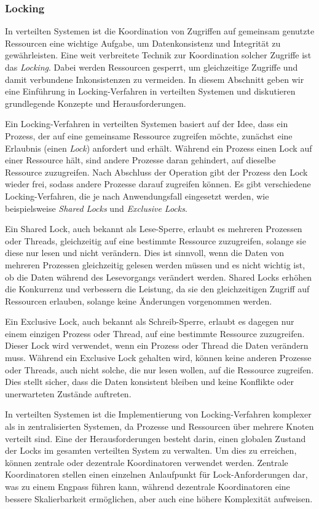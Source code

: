 \subsubsection{Locking}
In verteilten Systemen ist die Koordination von Zugriffen auf gemeinsam genutzte Ressourcen eine wichtige Aufgabe, um Datenkonsistenz und Integrität zu gewährleisten. Eine weit verbreitete Technik zur Koordination solcher Zugriffe ist das \textit{Locking}. Dabei werden Ressourcen gesperrt, um gleichzeitige Zugriffe und damit verbundene Inkonsistenzen zu vermeiden. In diesem Abschnitt geben wir eine Einführung in Locking-Verfahren in verteilten Systemen und diskutieren grundlegende Konzepte und Herausforderungen.

Ein Locking-Verfahren in verteilten Systemen basiert auf der Idee, dass ein Prozess, der auf eine gemeinsame Ressource zugreifen möchte, zunächst eine Erlaubnis (einen \textit{Lock}) anfordert und erhält. Während ein Prozess einen Lock auf einer Ressource hält, sind andere Prozesse daran gehindert, auf dieselbe Ressource zuzugreifen. Nach Abschluss der Operation gibt der Prozess den Lock wieder frei, sodass andere Prozesse darauf zugreifen können. Es gibt verschiedene Locking-Verfahren, die je nach Anwendungsfall eingesetzt werden, wie beispielsweise \textit{Shared Locks} und \textit{Exclusive Locks}.

Ein Shared Lock, auch bekannt als Lese-Sperre, erlaubt es mehreren Prozessen oder Threads, gleichzeitig auf eine bestimmte Ressource zuzugreifen, solange sie diese nur lesen und nicht verändern. Dies ist sinnvoll, wenn die Daten von mehreren Prozessen gleichzeitig gelesen werden müssen und es nicht wichtig ist, ob die Daten während des Lesevorgangs verändert werden. Shared Locks erhöhen die Konkurrenz und verbessern die Leistung, da sie den gleichzeitigen Zugriff auf Ressourcen erlauben, solange keine Änderungen vorgenommen werden.

Ein Exclusive Lock, auch bekannt als Schreib-Sperre, erlaubt es dagegen nur einem einzigen Prozess oder Thread, auf eine bestimmte Ressource zuzugreifen. Dieser Lock wird verwendet, wenn ein Prozess oder Thread die Daten verändern muss. Während ein Exclusive Lock gehalten wird, können keine anderen Prozesse oder Threads, auch nicht solche, die nur lesen wollen, auf die Ressource zugreifen. Dies stellt sicher, dass die Daten konsistent bleiben und keine Konflikte oder unerwarteten Zustände auftreten.

In verteilten Systemen ist die Implementierung von Locking-Verfahren komplexer als in zentralisierten Systemen, da Prozesse und Ressourcen über mehrere Knoten verteilt sind. Eine der Herausforderungen besteht darin, einen globalen Zustand der Locks im gesamten verteilten System zu verwalten. Um dies zu erreichen, können zentrale oder dezentrale Koordinatoren verwendet werden. Zentrale Koordinatoren stellen einen einzelnen Anlaufpunkt für Lock-Anforderungen dar, was zu einem Engpass führen kann, während dezentrale Koordinatoren eine bessere Skalierbarkeit ermöglichen, aber auch eine höhere Komplexität aufweisen.

